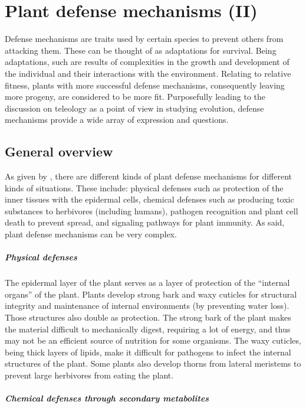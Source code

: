 \chapter{Plant defense mechanisms (II)}

Defense mechanisms are traits used by certain species to prevent others from attacking them.
These can be thought of as adaptations for survival.
Being adaptations, such are results of complexities in the growth and development of the individual and their interactions with the environment.
Relating to relative fitness, plants with more successful defense mechanisms, consequently leaving more progeny, are considered to be more fit. %
Purposefully leading to the discussion on teleology as a point of view in studying evolution, defense mechanisms provide a wide array of expression and questions.

\section{General overview}
As given by , there are different kinds of plant defense mechanisms for different kinds of situations.
These include: physical defenses such as protection of the inner tissues with the epidermal cells,
chemical defenses such as producing toxic substances to herbivores (including humans),
pathogen recognition and plant cell death to prevent spread, and
signaling pathways for plant immunity.
As said, plant defense mechanisms can be very complex.

\paragraph{Physical defenses}
The epidermal layer of the plant serves as a layer of protection of the ``internal organs'' of the plant.
Plants develop strong bark and waxy cuticles for structural integrity and maintenance of internal environments (by preventing water loss).
Those structures also double as protection.
The strong bark of the plant makes the material difficult to mechanically digest, requiring a lot of energy, and thus may not be an efficient source of nutrition for some organisms.
The waxy cuticles, being thick layers of lipids, make it difficult for pathogens to infect the internal structures of the plant.
Some plants also develop thorns from lateral meristems to prevent large herbivores from eating the plant.

\paragraph{Chemical defenses through secondary metabolites}

